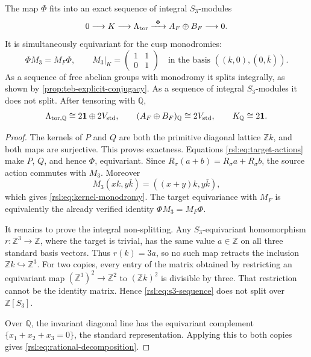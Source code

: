 \begin{theorem}
\label{rsl:thm:s3-sequence}
The map \(\Phi\) fits into an exact sequence of integral
\(S_3\)-modules
\begin{equation}
 0\longrightarrow K\longrightarrow\Lambda_{\rm tor}
 \xrightarrow{\ \Phi\ }A_F\oplus B_F\longrightarrow0.
 \label{rsl:eq:s3-sequence}
\end{equation}
It is simultaneously equivariant for the cusp monodromies:
\begin{equation}
 \Phi M_3=M_F\Phi,
 \qquad
 M_3|_K=\begin{pmatrix}1&1\\0&1\end{pmatrix}
 \quad\text{in the basis }((k,0),(0,\bar k)).
 \label{rsl:eq:kernel-monodromy}
\end{equation}
As a sequence of free abelian groups with monodromy it splits integrally, as
shown by \cref{prop:teb-explicit-conjugacy}.  As a sequence of integral
\(S_3\)-modules it does not split.  After tensoring with \(\mathbb Q\),
\begin{equation}
 \Lambda_{\rm tor,\mathbb Q}\cong
 2\mathbf 1\oplus2V_{\rm std},
 \qquad
 (A_F\oplus B_F)_{\mathbb Q}\cong2V_{\rm std},
 \qquad K_{\mathbb Q}\cong2\mathbf1.
 \label{rsl:eq:rational-decomposition}
\end{equation}
\end{theorem}

\begin{proof}
The kernels of \(P\) and \(Q\) are both the primitive diagonal lattice
\(\mathbb Zk\), and both maps are surjective.  This proves exactness.
Equations \eqref{rsl:eq:target-actions} make \(P\), \(Q\), and hence
\(\Phi\), equivariant.  Since \(R_\sigma(a+b)=R_\sigma a+R_\sigma b\), the
source action commutes with \(M_3\).  Moreover
\[
 M_3(xk,y\bar k)=((x+y)k,y\bar k),
\]
which gives \eqref{rsl:eq:kernel-monodromy}.  The target equivariance with
\(M_F\) is equivalently the already verified identity
\(\Phi M_3=M_F\Phi\).

It remains to prove the integral non-splitting.  Any \(S_3\)-equivariant
homomorphism \(r:\mathbb Z^3\to\mathbb Z\), where the target is trivial, has
the same value \(a\in\mathbb Z\) on all three standard basis vectors.  Thus
\(r(k)=3a\), so no such map retracts the inclusion
\(\mathbb Zk\hookrightarrow\mathbb Z^3\).  For two copies, every entry of
the matrix obtained by restricting an equivariant map
\((\mathbb Z^3)^2\to\mathbb Z^2\) to \((\mathbb Zk)^2\) is divisible by
three.  That restriction cannot be the identity matrix.  Hence
\eqref{rsl:eq:s3-sequence} does not split over \(\mathbb Z[S_3]\).

Over \(\mathbb Q\), the invariant diagonal line has the equivariant
complement \(\{x_1+x_2+x_3=0\}\), the standard representation.  Applying
this to both copies gives \eqref{rsl:eq:rational-decomposition}.
\end{proof}

